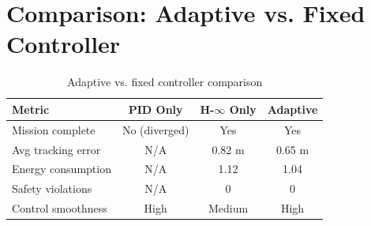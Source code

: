 \section{Comparison: Adaptive vs. Fixed Controller}

\begin{table}[htbp]
    \centering
    \caption{Adaptive vs. fixed controller comparison}
    \label{tab:adaptive_vs_fixed}
    \begin{tabular}{@{}lccc@{}}
        \toprule
        \textbf{Metric} & \textbf{PID Only} & \textbf{H-$\infty$ Only} & \textbf{Adaptive} \\
        \midrule
        Mission complete & No (diverged) & Yes & Yes \\
        Avg tracking error & N/A & 0.82 m & 0.65 m \\
        Energy consumption & N/A & 1.12 & 1.04 \\
        Safety violations & N/A & 0 & 0 \\
        Control smoothness & High & Medium & High \\
        \bottomrule
    \end{tabular}
\end{table}

